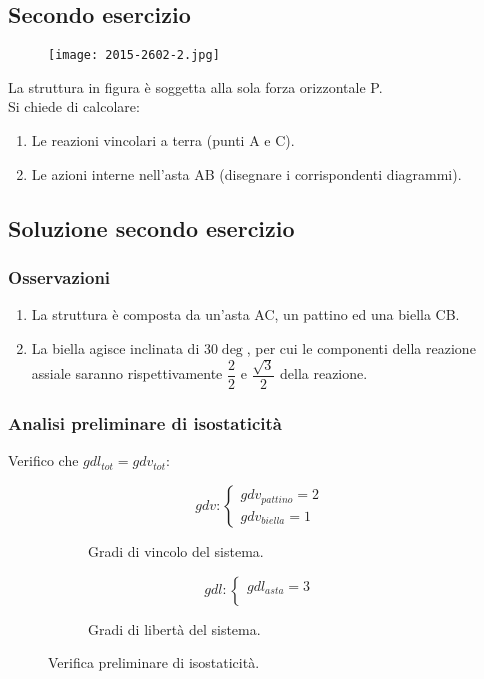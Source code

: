 \documentclass[main.tex]{subfiles}
\begin{document}
\subsection{Secondo esercizio}

\begin{figure}[H]
\centering
\texttt{[image: 2015-2602-2.jpg]}
\end{figure}

La struttura in figura è soggetta alla sola forza orizzontale P.
\\
Si chiede di calcolare:
\begin{enumerate}
\item Le reazioni vincolari a terra (punti A e C).
\item Le azioni interne nell’asta AB (disegnare i corrispondenti diagrammi).
\end{enumerate}

\clearpage

\subsection{Soluzione secondo esercizio}

\subsubsection{Osservazioni}

\begin{enumerate}
\item La struttura è composta da un'asta AC, un pattino ed una biella CB.
\item La biella agisce inclinata di $30\deg$, per cui le componenti della reazione assiale saranno rispettivamente $\dfrac{2}{2}$ e $\dfrac{\sqrt{3}}{2}$ della reazione.
\end{enumerate}

\subsubsection{Analisi preliminare di isostaticità}
Verifico che $gdl_{tot} = gdv_{tot}$:
\begin{figure}[H]
  \begin{subfigure}[b]{.5\textwidth}
  \centering
  \[
  	gdv: \begin{cases}
		gdv_{pattino} = 2\\
		gdv_{biella} = 1
  	\end{cases}
  \]
  \caption{Gradi di vincolo del sistema.}
  \end{subfigure}
  \hfill
  \begin{subfigure}[b]{.5\textwidth}
  \centering
  \[
  	gdl: \begin{cases}
  		gdl_{asta} = 3\\
  	\end{cases}
  \]
  \caption{Gradi di libertà del sistema.}
  \end{subfigure}
  \caption{Verifica preliminare di isostaticità.}
\end{figure}
\end{document}
